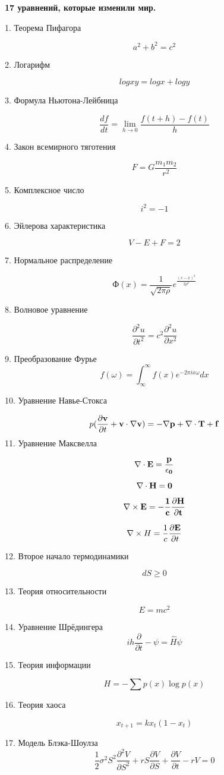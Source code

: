 \documentclass[12pt]{article}
\begin{document}
\begin{center}
\bf 17 уравнений, которые изменили мир.
\end{center}
		1. Теорема Пифагора
		
	\[
	   	{a^2+b^2=c^2} 
	\]
		
		2. Логарифм
		
	\[
		{logxy=logx+logy}
	\]
		
		3. Формула Ньютона-Лейбница
		
	\[
	{\frac{df}{dt}=\lim_{h \to 0} \frac{f(t+h)-f(t)}h}
	\]
		
		
		
		4. Закон всемирного тяготения
		
	\[
	{F=G\frac{m_1m_2}{r^2}}
	\]
		
		
		5. Комплексное число
		
	\[
	{i^2=-1} 
	\]
		
		
		6. Эйлерова характеристика
		
	\[
	{V-E+F=2}
	\]
				
		7. Нормальное распределение
		
	\[
	{Ф(x)=\frac1{\sqrt{2\pi\rho}}e^{\frac{(e-x)^2}{2\rho^2}}}
	\]
		
		
		8. Волновое уравнение
		
	\[
		{\frac{\partial^2 u}{\partial t^2}=c^2\frac{\partial^2 u}{\partial x^2}}
	\]
		
		
		9. Преобразование Фурье
	\[	
		{f(\omega)={\int_\infty^\infty}f\left(x\right){e}^{-2\pi i x\omega}dx}
	\]	
		
		10. Уравнение Навье-Стокса
	
	\[	
		{p(\frac{\partial \bf v}{\partial t}+\bf v \cdot \nabla \bf v) = - \nabla p + \nabla \cdot \bf T + \bf f}
	\]
		11. Уравнение Максвелла
	
	\[	
		{\nabla \cdot \bf E = \frac {p}{\epsilon_0}}
	\]
	
	\[
		{\nabla \cdot \bf H = 0}
	\]

	\[	
	     {\nabla  \times \bf E = - \frac{1}{c} \frac{\partial \bf H}{\partial t}}
	\]
	
	\[	
		{\nabla  \times H = \frac{1}{c} \frac{\partial \bf E}{\partial t}}
	\]	
		 
		12. Второе начало термодинамики
	
	\[	
		{dS\ge 0}
	\]
		
		13. Теория относительности
	
	\[	
		{E=mc^2}
	\]
		
		14. Уравнение Шрёдингера
	\[
		{ih \frac{\partial}{\partial t} - \psi = \hat H \psi}
	\]
		
		15. Теория информации
	
	\[	
		{H = - \sum p(x) \log p(x)}
	\]	
		
		16. Теория хаоса
	
	\[
		{x_{t+1}=kx_{t}(1-x_{t})}
	\]
		
		17. Модель Блэка-Шоулза  
	\[
		 {\frac{1}{2} \sigma^2 S^2 \frac{\partial^2 V}{\partial S^2} + rS \frac{\partial V}{\partial S} + \frac{\partial V}{\partial t} - rV = 0}
	\]
		
	
\end{document}
